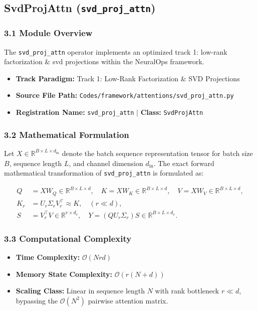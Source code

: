 \subsection{SvdProjAttn (\texttt{svd\_proj\_attn})}
\label{sec:app_module_svd\_proj\_attn}

\subsubsection*{3.1 Module Overview}
The \texttt{svd\_proj\_attn} operator implements an optimized track 1: low-rank factorization \& svd projections within the NeuralOps framework.
\begin{itemize}
    \item \textbf{Track Paradigm:} Track 1: Low-Rank Factorization & SVD Projections
    \item \textbf{Source File Path:} \texttt{Codes/framework/attentions/svd\_proj\_attn.py}
    \item \textbf{Registration Name:} \texttt{svd\_proj\_attn} $\mid$ \textbf{Class:} \texttt{SvdProjAttn}
\end{itemize}

\subsubsection*{3.2 Mathematical Formulation}
Let $X \in \mathbb{R}^{B \times L \times d_{\text{in}}}$ denote the batch sequence representation tensor for batch size $B$, sequence length $L$, and channel dimension $d_{\text{in}}$. The exact forward mathematical transformation of \texttt{svd\_proj\_attn} is formulated as:

\begin{align}
Q &= X W_Q \in \mathbb{R}^{B \times L \times d}, \quad K = X W_K \in \mathbb{R}^{B \times L \times d}, \quad V = X W_V \in \mathbb{R}^{B \times L \times d}, \\
K_r &= U_r \Sigma_r V_r^\top \approx K, \quad (r \ll d), \\
S &= V_r^\top V \in \mathbb{R}^{r \times d_v}, \quad Y = (Q U_r \Sigma_r) S \in \mathbb{R}^{B \times L \times d_v}.
\end{align}


\subsubsection*{3.3 Computational Complexity}
\begin{itemize}
    \item \textbf{Time Complexity:} $\mathcal{O}(N r d)$
    \item \textbf{Memory State Complexity:} $\mathcal{O}(r(N + d))$
    \item \textbf{Scaling Class:} Linear in sequence length $N$ with rank bottleneck $r \ll d$, bypassing the $\mathcal{O}(N^2)$ pairwise attention matrix.
\end{itemize}

